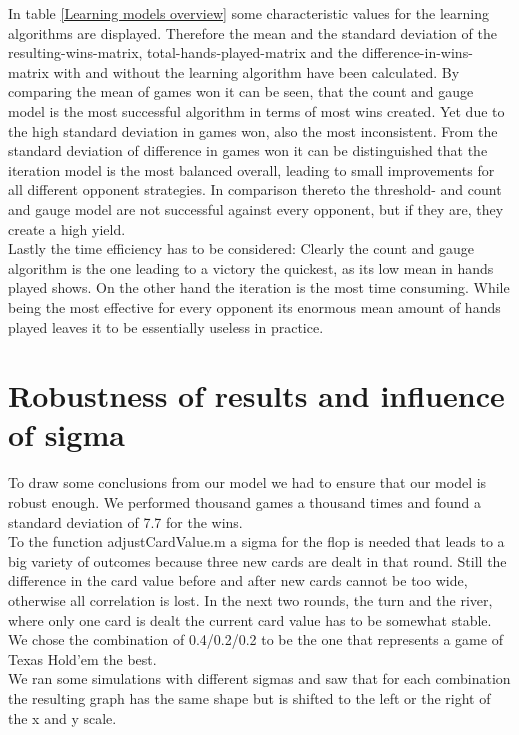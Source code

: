 \documentclass[11pt]{article}
\begin{document}
In table \ref{Learning models overview} some characteristic values for the learning algorithms are displayed. Therefore the mean and the standard deviation of the resulting-wins-matrix, total-hands-played-matrix and the difference-in-wins-matrix with and without the learning algorithm have been calculated. By comparing the mean of games won it can be seen, that the count and gauge model is the most successful algorithm in terms of most wins created. Yet due to the high standard deviation in games won, also the most inconsistent. From the standard deviation of difference in games won it can be distinguished that the iteration model is the most balanced overall, leading to small improvements for all different opponent strategies. In comparison thereto the threshold- and count and gauge model are not successful against every opponent, but if they are, they create a high yield. \\

Lastly the time efficiency has to be considered: Clearly the count and gauge algorithm is the one leading to a victory the quickest, as its low mean in hands played shows. On the other hand the iteration is the most time consuming. While being the most effective for every opponent its enormous mean amount of hands played leaves it to be essentially useless in practice.


\section{Robustness of results and influence of sigma}

To draw some conclusions from our model we had to ensure that our model is robust enough. We performed thousand games a thousand times and found a standard deviation of 7.7 for the wins.\\

To the function adjustCardValue.m a sigma for the flop is needed that leads to a big variety of outcomes because three new cards are dealt in that round. Still the difference in the card value before and after new cards cannot be too wide, otherwise all correlation is lost. In the next two rounds, the turn and the river, where only one card is dealt the current card value has to be somewhat stable.\\

We chose the combination of 0.4/0.2/0.2 to be the one that represents a game of Texas Hold'em the best. \\

We ran some simulations with different sigmas and saw that for each combination the resulting graph has the same shape but is shifted to the left or the right of the x and y scale.
\end{document}
